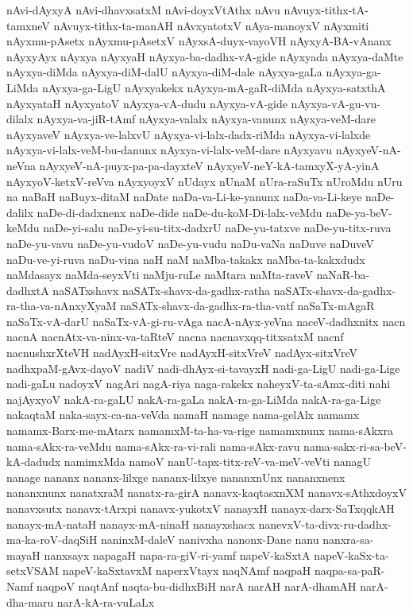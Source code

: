 {nAvi-dAyxyA
nAvi-dhavxsatxM
nAvi-doyxVtAthx
nAvu
nAvuyx-tithx-tA-tamxneV
nAvuyx-tithx-ta-manAH
nAvxyatotxV
nAya-manoyxV
nAyxmiti
nAyxmu-pAsetx
nAyxmu-pAsetxV
nAyxsA-duyx-vayoVH
nAyxyA-BA-vAnanx
nAyxyAyx
nAyxya
nAyxyaH
nAyxya-ba-dadhx-vA-gide
nAyxyada
nAyxya-daMte
nAyxya-diMda
nAyxya-diM-dalU
nAyxya-diM-dale
nAyxya-gaLa
nAyxya-ga-LiMda
nAyxya-ga-LigU
nAyxyakekx
nAyxya-mA-gaR-diMda
nAyxya-satxthA
nAyxyataH
nAyxyatoV
nAyxya-vA-dudu
nAyxya-vA-gide
nAyxya-vA-gu-vu-dilalx
nAyxya-va-jiR-tAmf
nAyxya-valalx
nAyxya-vanunx
nAyxya-veM-dare
nAyxyaveV
nAyxya-ve-lalxvU
nAyxya-vi-lalx-dadx-riMda
nAyxya-vi-lalxde
nAyxya-vi-lalx-veM-bu-danunx
nAyxya-vi-lalx-veM-dare
nAyxyavu
nAyxyeV-nA-neVna
nAyxyeV-nA-puyx-pa-pa-dayxteV
nAyxyeV-neY-kA-tamxyX-yA-yinA
nAyxyoV-ketxV-reVva
nAyxyoyxV
nUdayx
nUnaM
nUra-raSuTx
nUroMdu
nUru
na
naBaH
naBuyx-ditaM
naDate
naDa-va-Li-ke-yanunx
naDa-va-Li-keye
naDe-dalilx
naDe-di-dadxnenx
naDe-dide
naDe-du-koM-Di-lalx-veMdu
naDe-ya-beV-keMdu
naDe-yi-salu
naDe-yi-su-titx-dadxrU
naDe-yu-tatxve
naDe-yu-titx-ruva
naDe-yu-vavu
naDe-yu-vudoV
naDe-yu-vudu
naDu-vaNa
naDuve
naDuveV
naDu-ve-yi-ruva
naDu-vina
naH
naM
naMba-takakx
naMba-ta-kakxdudx
naMdasayx
naMda-seyxVti
naMju-ruLe
naMtara
naMta-raveV
naNaR-ba-dadhxtA
naSATxshavx
naSATx-shavx-da-gadhx-ratha
naSATx-shavx-da-gadhx-ra-tha-va-nAnxyXyaM
naSATx-shavx-da-gadhx-ra-tha-vatf
naSaTx-mAgaR
naSaTx-vA-darU
naSaTx-vA-gi-ru-vAga
nacA-nAyx-yeVna
naceV-dadhxnitx
nacn
nacnA
nacnAtx-va-ninx-va-taRteV
nacna
nacnavxqq-titxsatxM
nacnf
nacnushxrXteVH
nadAyxH-sitxVre
nadAyxH-sitxVreV
nadAyx-sitxVreV
nadhxpaM-gAvx-dayoV
nadiV
nadi-dhAyx-si-tavayxH
nadi-ga-LigU
nadi-ga-Lige
nadi-gaLu
nadoyxV
nagAri
nagA-riya
naga-rakekx
naheyxV-ta-sAmx-diti
nahi
najAyxyoV
nakA-ra-gaLU
nakA-ra-gaLa
nakA-ra-ga-LiMda
nakA-ra-ga-Lige
nakaqtaM
naka-sayx-ca-na-veVda
namaH
namage
nama-gelAlx
namamx
namamx-Barx-me-mAtarx
namamxM-ta-ha-va-rige
namamxnunx
nama-sAkxra
nama-sAkx-ra-veMdu
nama-sAkx-ra-vi-rali
nama-sAkx-ravu
nama-sakx-ri-sa-beV-kA-dadudx
namimxMda
namoV
nanU-tapx-titx-reV-va-meV-veVti
nanagU
nanage
nananx
nananx-lilxge
nananx-lilxye
nananxnUnx
nananxnenx
nananxnunx
nanatxraM
nanatx-ra-girA
nanavx-kaqtasxnXM
nanavx-sAthxdoyxV
nanavxsutx
nanavx-tArxpi
nanavx-yukotxV
nanayxH
nanayx-darx-SaTxqqkAH
nanayx-mA-nataH
nanayx-mA-ninaH
nanayxshacx
nanevxV-ta-divx-ru-dadhx-ma-ka-roV-daqSiH
naninxM-daleV
nanivxha
nanonx-Dane
nanu
nanxra-sa-mayaH
nanxsayx
napagaH
napa-ra-giV-ri-yamf
napeV-kaSxtA
napeV-kaSx-ta-setxVSAM
napeV-kaSxtavxM
naperxVtayx
naqNAmf
naqpaH
naqpa-sa-paR-Namf
naqpoV
naqtAnf
naqta-bu-didhxBiH
narA
narAH
narA-dhamAH
narA-dha-maru
narA-kA-ra-vuLaLx
}
